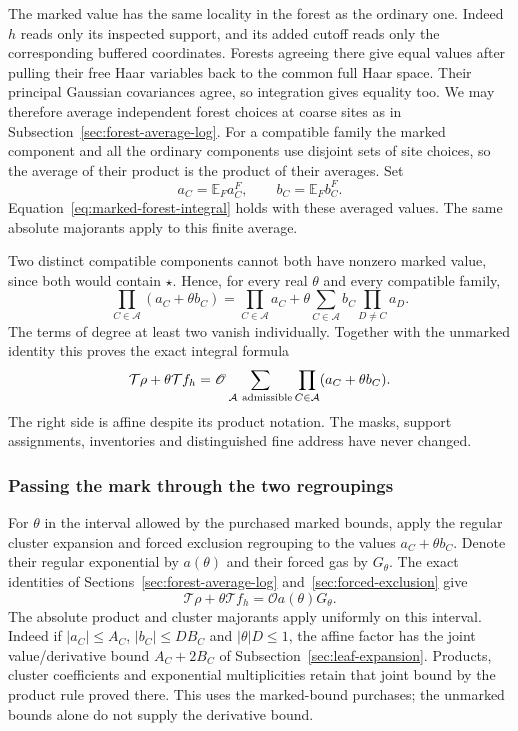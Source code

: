The marked value has the same locality in the forest as the ordinary
one. Indeed $h$ reads only its inspected support, and its added
cutoff reads only the corresponding buffered coordinates. Forests
agreeing there give equal values after pulling their free Haar
variables back to the common full Haar space. Their principal
Gaussian covariances agree, so integration gives equality too.
We may therefore average independent forest choices at coarse
sites as in Subsection~\ref{sec:forest-average-log}. For a compatible
family the marked component and all the ordinary components use
disjoint sets of site choices, so the average of their product is
the product of their averages. Set
\[
             a_C=\mathbb E_F a_C^F,\qquad b_C=\mathbb E_F b_C^F.
\]
Equation~\eqref{eq:marked-forest-integral} holds with these averaged
values. The same absolute majorants apply to this finite average.

Two distinct compatible components cannot both have nonzero marked
value, since both would contain $\star$. Hence, for every real
$\theta$ and every compatible family,
\[
 \prod_{C\in\mathcal A}(a_C+\theta b_C)
 =\prod_{C\in\mathcal A}a_C
  +\theta\sum_{C\in\mathcal A}b_C
                           \prod_{D\ne C}a_D.
\]
The terms of degree at least two vanish individually. Together
with the unmarked identity this proves the exact integral formula
\begin{equation}\label{eq:marked-affine-integral}
 \mathcal T\rho+\theta\mathcal T f_h
   =\mathscr O\sum_{\mathcal A\ {\rm admissible}}
                               \prod_{C\in\mathcal A}(a_C+\theta b_C).
\end{equation}
The right side is affine despite its product notation. The masks,
support assignments, inventories and distinguished fine address
have never changed.

\subsubsection{Passing the mark through the two regroupings}
For $\theta$ in the interval allowed by the purchased marked bounds,
apply the regular cluster expansion and forced exclusion regrouping
to the values $a_C+\theta b_C$. Denote their regular exponential
by $a(\theta)$ and their forced gas by $G_\theta$. The exact
identities of Sections~\ref{sec:forest-average-log}
and~\ref{sec:forced-exclusion} give
\[
 \mathcal T\rho+\theta\mathcal T f_h
                         =\mathscr O a(\theta)G_\theta.
\]
The absolute product and cluster majorants apply uniformly on this
interval. Indeed if $|a_C|\le A_C$, $|b_C|\le D B_C$ and
$|\theta|D\le1$, the affine factor has the joint value/derivative
bound $A_C+2B_C$ of Subsection~\ref{sec:leaf-expansion}. Products,
cluster coefficients and exponential multiplicities retain that
joint bound by the product rule proved there. This uses the
marked-bound purchases; the unmarked bounds alone do not supply
the derivative bound.

